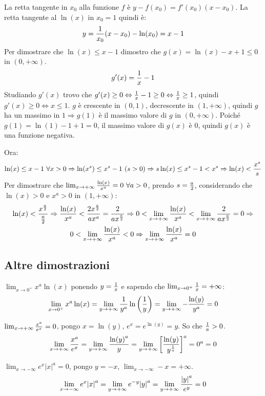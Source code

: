 \documentclass[12pt,a4paper]{article}
\begin{document}
La retta tangente in $x_0$ alla funzione $f$ \`e $ y - f(x_0) = 
f'(x_0) (x - x_0)$. La retta tangente al $\ln(x)$ in $x_0 = 1$ 
quindi \`e:
$$ y = {1 \over x_0} (x - x_0) - \ln(x_0) = x-1 $$
Per dimostrare che $\ln(x) \leq x-1$ dimostro che $g(x) = \ln(x) - x + 1
\leq 0$ in $(0, +\infty)$.
$$ g'(x) = {1 \over x} - 1 $$
Studiando $g'(x)$ trovo che $ g'(x) \geq 0 \Leftrightarrow {1 \over x} - 1
\geq 0 \Leftrightarrow {1 \over x} \geq 1 $, quindi $g'(x) \geq 0 
\Leftrightarrow x \leq 1$. $g$ \`e crescente in $(0,1)$, decrescente in
$(1,+\infty)$, quindi $g$ ha un massimo in $1 \Rightarrow g(1)$ \`e il massimo
valore di $g$ in $(0,+\infty)$. Poich\'e $g(1) = \ln(1) - 1 + 1 = 0$, il
massimo valore di $g(x)$ \`e $0$, quindi $g(x)$ \`e una funzione negativa.

Ora:
$$
\ln(x) \leq x-1 \ \forall x > 0 \Rightarrow \ln(x^s) \leq x^s - 1 \ (s > 0) 
\Rightarrow s \ln(x) \leq x^s -1 < x^s \Rightarrow \ln(x) < {x^s \over s}
$$
Per dimostrare che $ \lim_{x \to +\infty} {\ln(x) \over x^a} = 0 
\ \forall a > 0 $, prendo $s = {a \over 2}$, considerando che
$\ln(x) > 0$ e $x^a >0$ in $(1,+\infty)$:
\begin{multline*}
\ln(x) < { x^{a \over 2} \over {a \over 2}} \Rightarrow
{ \ln(x) \over x^a} < {2 x^{a \over 2} \over a x^a} = 
{2 \over a x^{a \over 2}} \Rightarrow 
0 < \lim_{x \to +\infty} {\ln(x) \over x^a} < 
\lim_{x \to +\infty} {2 \over a x^{a \over 2}} = 0
\Rightarrow  \\ 0 < \lim_{x \to +\infty} {\ln(x) \over x^a} < 0
\Rightarrow \lim_{x \to +\infty} {\ln(x) \over x^a} = 0
\end{multline*}

\subsection{Altre dimostrazioni}
$ \lim_{x \to 0^+} x^a \ln(x)$ ponendo $y = {1 \over x}$ e sapendo che
$ \lim_{x \to 0^+} {1 \over x} = + \infty $:
$$ \lim_{x \to 0^+} x^a \ln(x) = 
\lim_{y \to +\infty} {1 \over y^a} \ln \left({1 \over y} \right) = 
\lim_{y \to +\infty} - {\ln(y) \over y^a} = 0 $$

$ \lim_{x \to +\infty} {x^a \over e^x} = 0$, pongo $x = \ln(y)$, 
$e^x = e^{\ln(y)} = y$. So che ${1 \over a} > 0$.
$$
\lim_{x \to +\infty} {x^a \over e^x} = 
\lim_{y \to +\infty} {{\ln(y)}^a \over y} = 
\lim_{y \to +\infty} {\left[ {\ln(y) \over y^{1 \over a}} \right]}^a = 
0^a = 0
$$

$ \lim_{x \to -\infty} e^x {|x|}^a = 0 $, pongo $y = -x$,
$\lim_{x \to -\infty} -x = +\infty$.
$$
\lim_{x \to -\infty} e^x {|x|}^a =
\lim_{y \to +\infty} e^{-y} {|y|}^a =
\lim_{y \to +\infty} {{|y|}^a \over e^y} = 0
$$
\end{document}

